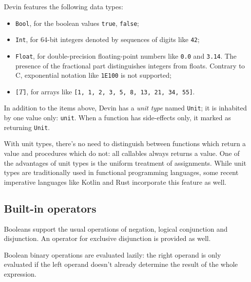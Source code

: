 \documentclass[UdineBachThesis,american,11pt]{PhdThesis}
\begin{document}
  Devin features the following data types:

  \begin{itemize}
    \item \mbox{\texttt{Bool}}, for the boolean values \mbox{\texttt{true}},
    \mbox{\texttt{false}};

    \item \mbox{\texttt{Int}}, for 64-bit integers denoted by sequences of
    digits like \mbox{\texttt{42}};

    \item \mbox{\texttt{Float}}, for double-precision floating-point numbers
    like \mbox{\texttt{0.0}} and \mbox{\texttt{3.14}}. The presence of the
    fractional part distinguishes integers from floats. Contrary to C,
    exponential notation like \mbox{\texttt{1E100}} is not supported;

    \item \mbox{\texttt{[$T$]}}, for arrays like
    \mbox{\texttt{[1, 1, 2, 3, 5, 8, 13, 21, 34, 55]}}.
  \end{itemize}

  In addition to the items above, Devin has a \emph{unit type} named
  \mbox{\texttt{Unit}}; it is inhabited by one value only: \mbox{\texttt{unit}}.
  When a function has side-effects only, it marked as returning
  \mbox{\texttt{Unit}}.

  With unit types, there's no need to distinguish between functions which return
  a value and procedures which do not: all callables always returns a value. One
  of the advantages of unit types is the uniform treatment of assignments. While
  unit types are traditionally used in functional programming languages, some
  recent imperative languages like Kotlin and Rust incorporate this feature as
  well.

  \subsection{Built-in operators}

  Booleans support the usual operations of negation, logical conjunction and
  disjunction. An operator for exclusive disjunction is provided as well.

  Boolean binary operations are evaluated lazily: the right operand is only
  evaluated if the left operand doesn't already determine the result of the
  whole expression.
\end{document}
